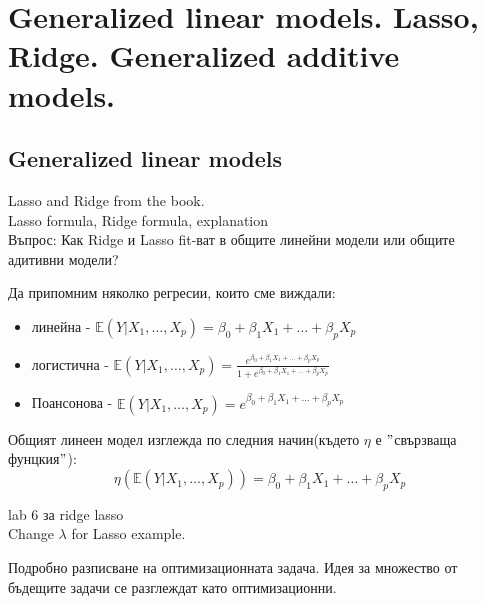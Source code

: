 \section{Generalized linear models. Lasso, Ridge. Generalized additive models. }
\subsection{Generalized linear models}


	Lasso and Ridge from the book.\\
	Lasso formula, Ridge formula, explanation \\
	Въпрос: Как Ridge и Lasso fit-ват в общите линейни модели или
	общите адитивни модели?
	
	
	
	Да припомним няколко регресии, които сме виждали:\\
	\begin{itemize}
		\item линейна - $\mathbb{E}(Y|X_1, \dots, X_p) = \beta_0 + \beta_1 X_1 + \dots + \beta_p X_p $
		\item логистична -  $ \mathbb{E}(Y|X_1, \dots, X_p) = \frac{e^{\beta_0 + \beta_1 X_1 + \dots + \beta_p X_p}}{1+ e^{\beta_0 + \beta_1 X_1 + \dots + \beta_p X_p}} $
		\item Поансонова -  $ \mathbb{E}(Y|X_1, \dots, X_p) = e^{\beta_0 + \beta_1 X_1 + \dots + \beta_p X_p} $
 	\end{itemize}
	
	Общият линеен модел изглежда по следния начин(където $\eta$ е $"$свързваща фунцкия$"$):\\
	$$\eta(\mathbb{E}(Y|X_1, \dots, X_p)) = \beta_0 + \beta_1 X_1 + \dots + \beta_p X_p $$
	
	lab 6 за ridge lasso \\
	Change $\lambda$ for Lasso example.
	
	
	
	Подробно разписване на оптимизационната задача. Идея за множество от бъдещите задачи
	се разглеждат като оптимизационни.
	
\newpage	
